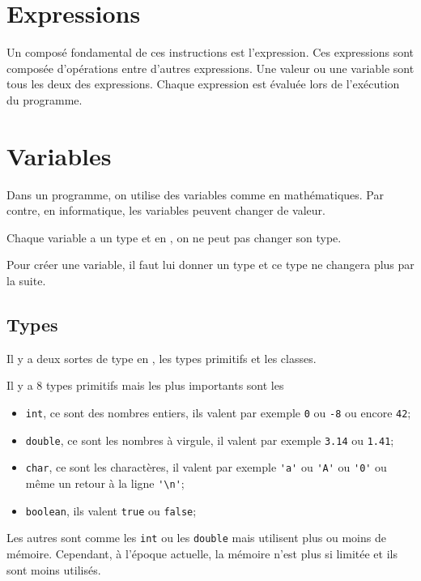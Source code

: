 \section{Expressions}

Un composé fondamental de ces instructions est l'expression.
Ces expressions sont composée d'opérations entre d'autres expressions.
Une valeur ou une variable sont tous les deux des expressions.
Chaque expression est évaluée lors de l'exécution du programme.

\section{Variables}
Dans un programme, on utilise des variables comme en mathématiques.
Par contre, en informatique, les variables peuvent changer de valeur.

Chaque variable a un type et en \java{}, on ne peut pas changer son type.

Pour créer une variable, il faut lui donner un type et ce type ne changera
plus par la suite.
\subsection{Types}
Il y a deux sortes de type en \java{}, les types primitifs et les classes.

Il y a 8 types primitifs mais les plus importants sont les
\begin{itemize}
  \item \verb|int|, ce sont des nombres entiers, ils valent par exemple
    \verb|0| ou \verb|-8| ou encore \verb|42|;
  \item \verb|double|, ce sont les nombres à virgule, il valent par exemple
    \verb|3.14| ou \verb|1.41|;
  \item \verb|char|, ce sont les charactères, il valent par exemple \verb|'a'|
    ou \verb|'A'| ou \verb|'0'| ou même un retour à la ligne \verb|'\n'|;
  \item \verb|boolean|, ils valent \verb|true| ou \verb|false|;
\end{itemize}
Les autres sont comme les \verb|int| ou les \verb|double| mais utilisent plus
ou moins de mémoire. Cependant, à l'époque actuelle, la mémoire n'est plus
si limitée et ils sont moins utilisés.

